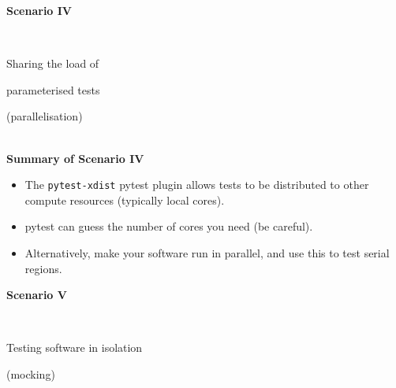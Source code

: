 \documentclass[12pt]{article}
\newlength{\geometrytop}
\newcommand{\slidetitle}[1]{~\\[-0.5ex]{\Large\bf{\color{bold}#1}}\\}
\begin{document}
\thispagestyle{plain}
\vspace*{-\topskip}
\vspace*{\fill}
{\Huge\centerline{\textbf{Scenario IV}}~\newline
\centerline{Sharing the load of}
\centerline{parameterised tests}
\centerline{(parallelisation)}}
\vspace*{\fill}
\vspace*{\geometrytop}
\clearpage

\slidetitle{Summary of Scenario IV}
\begin{itemize}
\item The \verb|pytest-xdist| pytest plugin allows tests to be distributed to
    other compute resources (typically local cores).
\item pytest can guess the number of cores you need (be careful).
\item Alternatively, make your software run in parallel, and use this to test
    serial regions.
\end{itemize}
\clearpage

\thispagestyle{plain}
\vspace*{-\topskip}
\vspace*{\fill}
{\Huge\centerline{\textbf{Scenario V}}~\newline
\centerline{Testing software in isolation}
\centerline{(mocking)}}
\vspace*{\fill}
\vspace*{\geometrytop}
\clearpage
\end{document}
